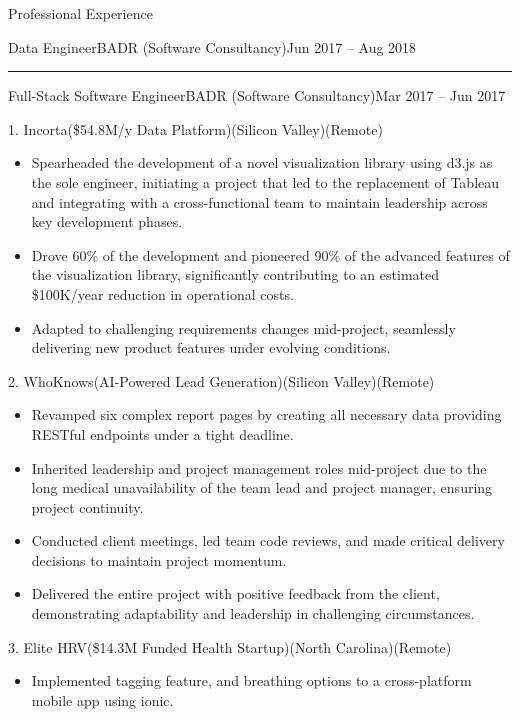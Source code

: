 \documentclass[]{ahmedamrcv}
\begin{document}
\begin{cvsection}{Professional Experience}
\begin{cvsubsection}{Data Engineer}{BADR (Software Consultancy)}{Jun 2017 -- Aug 2018}
            \end{cvsubsection}
            \centering\rule{300pt}{0.4pt}
            \begin{cvsubsection}{Full-Stack Software Engineer}{BADR (Software Consultancy)}{Mar 2017 -- Jun 2017}
            \begin{cvsubsection}{1. Incorta}{(\$54.8M/y Data Platform)}{(Silicon Valley)(Remote)}
			\begin{itemize}
				\item Spearheaded the development of a novel visualization library using d3.js as the sole engineer, initiating a project that led to the replacement of Tableau and integrating with a cross-functional team to maintain leadership across key development phases.
                    \item Drove 60\% of the development and pioneered 90\% of the advanced features of the visualization library, significantly contributing to an estimated \$100K/year reduction in operational costs.
                    \item Adapted to challenging requirements changes mid-project, seamlessly delivering new product features under evolving conditions.
			\end{itemize}
		\end{cvsubsection}
            \begin{cvsubsection}{2. WhoKnows}{(AI-Powered Lead Generation)}{(Silicon Valley)(Remote)}
			\begin{itemize}
				\item Revamped six complex report pages by creating all necessary data providing RESTful endpoints under a tight deadline.
                    \item Inherited leadership and project management roles mid-project due to the long medical unavailability of the team lead and project manager, ensuring project continuity.
                    \item Conducted client meetings, led team code reviews, and made critical delivery decisions to maintain project momentum.
                    \item Delivered the entire project with positive feedback from the client, demonstrating adaptability and leadership in challenging circumstances.
			\end{itemize}
		\end{cvsubsection}
            \begin{cvsubsection}{3. Elite HRV}{(\$14.3M Funded Health Startup)}{(North Carolina)(Remote)}
			\begin{itemize}
				\item Implemented tagging feature, and breathing options to a cross-platform mobile app using ionic.
			\end{itemize}
		\end{cvsubsection}
            \end{cvsubsection}
            

\end{cvsection}
\end{document}
